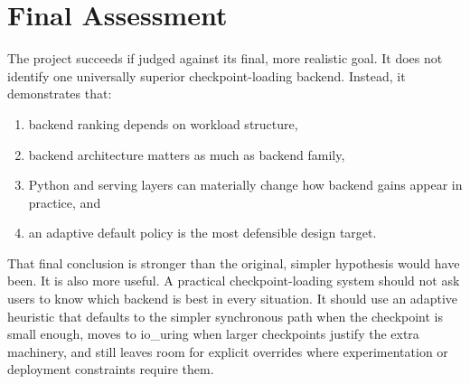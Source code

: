 \section{Final Assessment}

The project succeeds if judged against its final, more realistic goal. It does not identify one universally superior checkpoint-loading backend. Instead, it demonstrates that:

\begin{enumerate}
\item backend ranking depends on workload structure,
\item backend architecture matters as much as backend family,
\item Python and serving layers can materially change how backend gains appear in practice, and
\item an adaptive default policy is the most defensible design target.
\end{enumerate}

That final conclusion is stronger than the original, simpler hypothesis would have been. It is also more useful. A practical checkpoint-loading system should not ask users to know which backend is best in every situation. It should use an adaptive heuristic that defaults to the simpler synchronous path when the checkpoint is small enough, moves to io\_uring when larger checkpoints justify the extra machinery, and still leaves room for explicit overrides where experimentation or deployment constraints require them.
